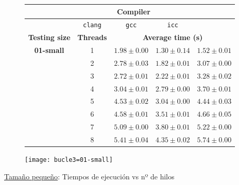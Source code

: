\begin{figure}[H]
    \centering
    \begin{subfigure}{0.4\textwidth}
        \begin{adjustbox}{width=\textwidth} 
        \begin{tabular}{|c|c|c|c|c|}
            \hline
            \rowcolor{azul} \multicolumn{2}{|c|}{}&\multicolumn{3}{c|}{\textbf{Compiler}} \\ \hline
            \rowcolor{azul} \multicolumn{2}{|c|}{}&\texttt{clang}&\texttt{gcc}&\texttt{icc}\\ \hline
            \rowcolor{azul} \textbf{Testing size} & \textbf{Threads}&\multicolumn{3}{c|}{\textbf{Average time (s)}} \\ \hline
            \multirow{8}{1cm}{\textbf{01-small}} & 1 & \(1.98\pm{0.00}\) & \(1.30\pm{0.14}\) & \(1.52\pm{0.01}\) \\ \cline{2-5}
            & 2 & \(2.78\pm{0.03}\) & \(1.82\pm{0.01}\) & \(3.07\pm{0.00}\) \\ \cline{2-5}
            & 3 & \(2.72\pm{0.01}\) & \(2.22\pm{0.01}\) & \(3.28\pm{0.02}\) \\ \cline{2-5}
            & 4 & \(3.04\pm{0.01}\) & \(2.79\pm{0.00}\) & \(3.70\pm{0.01}\) \\ \cline{2-5}
            & 5 & \(4.53\pm{0.02}\) & \(3.04\pm{0.00}\) & \(4.44\pm{0.03}\) \\ \cline{2-5}
            & 6 & \(4.58\pm{0.01}\) & \(3.51\pm{0.01}\) & \(4.66\pm{0.05}\) \\ \cline{2-5}
            & 7 & \(5.09\pm{0.00}\) & \(3.80\pm{0.01}\) & \(5.22\pm{0.00}\) \\ \cline{2-5}
            & 8 & \(5.41\pm{0.04}\) & \(4.35\pm{0.02}\) & \(5.74\pm{0.00}\) \\ \hline
        \end{tabular}
        \end{adjustbox}
    \end{subfigure}
    \hfill
    \begin{subfigure}{0.5\textwidth}
        \texttt{[image: bucle3=01-small]}
    \end{subfigure}
    \caption{\underline{Tamaño pequeño}: Tiempos de ejecución vs nº de hilos}
    \label{fig:bucle3=01-small}
\end{figure}

